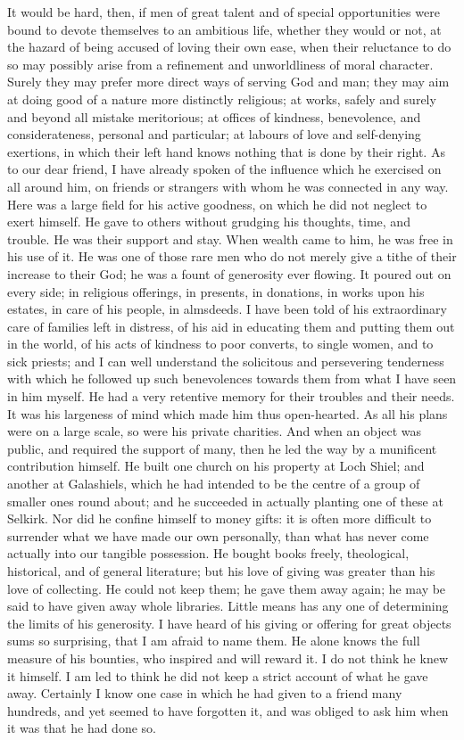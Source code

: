 It would be hard, then, if men of great talent and of
special opportunities were bound to devote themselves to
an ambitious life, whether they would or not, at the
hazard of being accused of loving their own ease, when
their reluctance to do so may possibly arise from a
refinement and unworldliness of moral character. Surely
they may prefer more direct ways of serving God and man;
they may aim at doing good of a nature more distinctly
religious; at works, safely and surely and beyond all
mistake meritorious; at offices of kindness, benevolence,
and considerateness, personal and particular; at labours
of love and self-denying exertions, in which their left
hand knows nothing that is done by their right. As to our
dear friend, I have already spoken of the influence which
he exercised on all around him, on friends or strangers
with whom he was connected in any way. Here was a large
field for his active goodness, on which he did not
neglect to exert himself. He gave to others without
grudging his thoughts, time, and trouble. He was their
support and stay. When wealth came to him, he was free in
his use of it. He was one of those rare men who do not
merely give a tithe of their increase to their God; he
was a fount of generosity ever flowing. It poured out on
every side; in religious offerings, in presents, in
donations, in works upon his estates, in care of his
people, in almsdeeds. I have been told of his
extraordinary care of families left in distress, of his
aid in educating them and putting them out in the world,
of his acts of kindness to poor converts, to single
women, and to sick priests; and I can well understand the
solicitous and persevering tenderness with which he
followed up such benevolences towards them from what I
have seen in him myself. He had a very retentive memory
for their troubles and their needs. It was his largeness
of mind which made him thus open-hearted. As all his
plans were on a large scale, so were his private
charities. And when an object was public, and required
the support of many, then he led the way by a munificent
contribution himself. He built one church on his property
at Loch Shiel; and another at Galashiels, which he had
intended to be the centre of a group of smaller ones
round about; and he succeeded in actually planting one of
these at Selkirk. Nor did he confine himself to money
gifts: it is often more difficult to surrender what we
have made our own personally, than what has never come
actually into our tangible possession. He bought books
freely, theological, historical, and of general
literature; but his love of giving was greater than his
love of collecting. He could not keep them; he gave them
away again; he may be said to have given away whole
libraries. Little means has any one of determining the
limits of his generosity. I have heard of his giving or
offering for great objects sums so surprising, that I am
afraid to name them. He alone knows the full measure of
his bounties, who inspired and will reward it. I do not
think he knew it himself. I am led to think he did not
keep a strict account of what he gave away. Certainly I
know one case in which he had given to a friend many
hundreds, and yet seemed to have forgotten it, and was
obliged to ask him when it was that he had done so.

